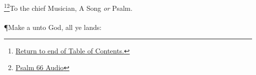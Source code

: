 \footnote{\textcolor[rgb]{0.00,0.25,0.00}{\hyperlink{TOC}{Return to end of Table of Contents.}}}\footnote{\href{https://audiobible.com/bible/psalms_66.html}{\textcolor[cmyk]{0.99998,1,0,0}{Psalm 66 Audio}}}\textcolor[cmyk]{0.99998,1,0,0}{To the chief Musician, A Song \emph{or} Psalm.}\\
\\
\P \textcolor[cmyk]{0.99998,1,0,0}{Make a  unto God, all ye lands:} %
